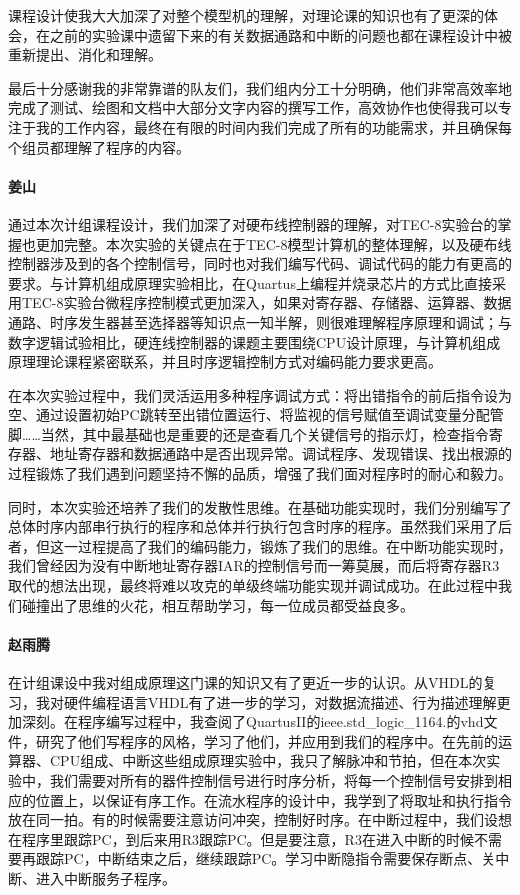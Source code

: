 \documentclass[lang=cn,11pt,a4paper,cite=authornum]{paper}
\begin{document}
课程设计使我大大加深了对整个模型机的理解，对理论课的知识也有了更深的体会，在之前的实验课中遗留下来的有关数据通路和中断的问题也都在课程设计中被重新提出、消化和理解。

最后十分感谢我的非常靠谱的队友们，我们组内分工十分明确，他们非常高效率地完成了测试、绘图和文档中大部分文字内容的撰写工作，高效协作也使得我可以专注于我的工作内容，最终在有限的时间内我们完成了所有的功能需求，并且确保每个组员都理解了程序的内容。

\paragraph{姜山}

通过本次计组课程设计，我们加深了对硬布线控制器的理解，对TEC-8实验台的掌握也更加完整。本次实验的关键点在于TEC-8模型计算机的整体理解，以及硬布线控制器涉及到的各个控制信号，同时也对我们编写代码、调试代码的能力有更高的要求。与计算机组成原理实验相比，在Quartus上编程并烧录芯片的方式比直接采用TEC-8实验台微程序控制模式更加深入，如果对寄存器、存储器、运算器、数据通路、时序发生器甚至选择器等知识点一知半解，则很难理解程序原理和调试；与数字逻辑试验相比，硬连线控制器的课题主要围绕CPU设计原理，与计算机组成原理理论课程紧密联系，并且时序逻辑控制方式对编码能力要求更高。

在本次实验过程中，我们灵活运用多种程序调试方式：将出错指令的前后指令设为空、通过设置初始PC跳转至出错位置运行、将监视的信号赋值至调试变量分配管脚……当然，其中最基础也是重要的还是查看几个关键信号的指示灯，检查指令寄存器、地址寄存器和数据通路中是否出现异常。调试程序、发现错误、找出根源的过程锻炼了我们遇到问题坚持不懈的品质，增强了我们面对程序时的耐心和毅力。

同时，本次实验还培养了我们的发散性思维。在基础功能实现时，我们分别编写了总体时序内部串行执行的程序和总体并行执行包含时序的程序。虽然我们采用了后者，但这一过程提高了我们的编码能力，锻炼了我们的思维。在中断功能实现时，我们曾经因为没有中断地址寄存器IAR的控制信号而一筹莫展，而后将寄存器R3取代的想法出现，最终将难以攻克的单级终端功能实现并调试成功。在此过程中我们碰撞出了思维的火花，相互帮助学习，每一位成员都受益良多。

\paragraph{赵雨腾}

在计组课设中我对组成原理这门课的知识又有了更近一步的认识。从VHDL的复习，我对硬件编程语言VHDL有了进一步的学习，对数据流描述、行为描述理解更加深刻。在程序编写过程中，我查阅了QuartusII的ieee.std\_logic\_1164.的vhd文件，研究了他们写程序的风格，学习了他们，并应用到我们的程序中。在先前的运算器、CPU组成、中断这些组成原理实验中，我只了解脉冲和节拍，但在本次实验中，我们需要对所有的器件控制信号进行时序分析，将每一个控制信号安排到相应的位置上，以保证有序工作。在流水程序的设计中，我学到了将取址和执行指令放在同一拍。有的时候需要注意访问冲突，控制好时序。在中断过程中，我们设想在程序里跟踪PC，到后来用R3跟踪PC。但是要注意，R3在进入中断的时候不需要再跟踪PC，中断结束之后，继续跟踪PC。学习中断隐指令需要保存断点、关中断、进入中断服务子程序。
\end{document}

